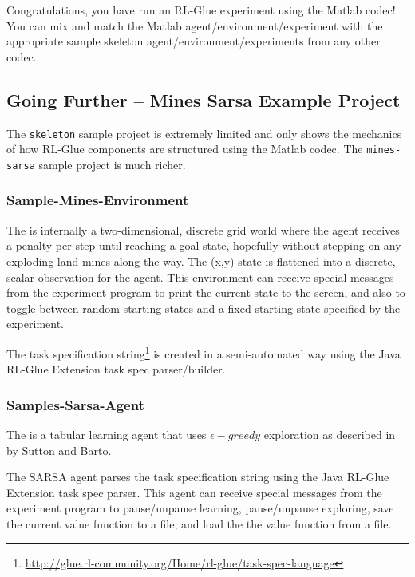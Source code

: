 \documentclass[11pt]{article}
\begin{document}
Congratulations, you have run an RL-Glue experiment using the Matlab codec!  You can mix and match the Matlab agent/environment/experiment with the appropriate sample skeleton agent/environment/experiments from any other codec.

\subsection{Going Further -- Mines Sarsa Example Project}
\label{mines-sarsa-sample}
The \texttt{skeleton} sample project is extremely limited and only shows the mechanics of how RL-Glue components are structured using the Matlab codec.  The \texttt{mines-sarsa} sample project is much richer.

\subsubsection{Sample-Mines-Environment}
\label{mines-sample}
The 
is internally a two-dimensional, discrete grid world where the agent receives a penalty per step until reaching a goal state, hopefully without stepping on any exploding land-mines along the way.  The (x,y) state is flattened into a discrete, scalar observation for the agent.  This environment can receive special messages from the experiment program to print the current state to the screen, and also to toggle between random starting states and a fixed starting-state specified by the experiment.

The task specification string\footnote{\url{http://glue.rl-community.org/Home/rl-glue/task-spec-language}} is created in a semi-automated way using the Java RL-Glue Extension task spec parser/builder. 

\subsubsection{Samples-Sarsa-Agent}
\label{sarsa-sample}
The 
is a tabular learning agent that uses $\epsilon-greedy$ exploration as described in  by Sutton and Barto.

The SARSA agent parses the task specification string using the Java RL-Glue Extension task spec parser.  This agent can receive special messages from the experiment program to pause/unpause learning, pause/unpause exploring, save the current value function to a file, and load the the value function from a file.
\end{document}
